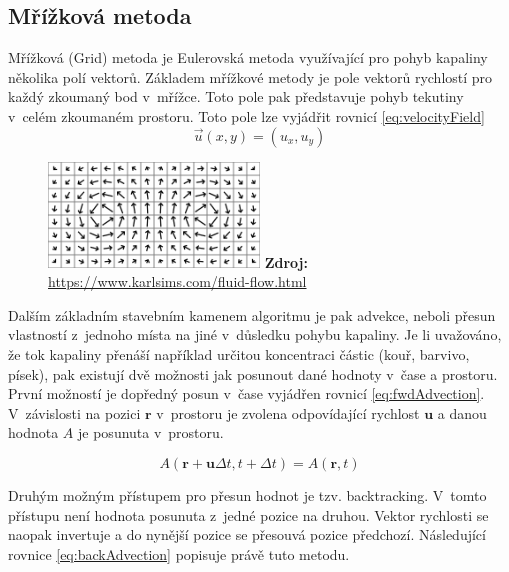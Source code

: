 \subsection{Mřížková metoda}
\label{chapter:Grid}
Mřížková (Grid) metoda je Eulerovská metoda využívající pro pohyb kapaliny několika polí vektorů. Základem mřížkové metody je pole vektorů rychlostí pro každý zkoumaný bod v~mřížce. Toto pole pak představuje pohyb tekutiny v~celém zkoumaném prostoru. Toto pole lze vyjádřit rovnicí \ref{eq:velocityField}
\begin{equation}
	\Vec{u}(x,y) = (u_x,u_y)
	\label{eq:velocityField}
\end{equation}

\begin{figure}[hbt]
	\captionsetup{justification=centering}
	\centering
	\includegraphics[width=0.5\textwidth]{obrazky-figures/flow-field.png}
	\textbf{Zdroj: } \url{https://www.karlsims.com/fluid-flow.html}
	\label{fig:VelocityField}
\end{figure}

Dalším základním stavebním kamenem algoritmu je pak advekce, neboli přesun vlastností z~jednoho místa na jiné v~důsledku pohybu kapaliny. Je li uvažováno, že tok kapaliny přenáší například určitou koncentraci částic (kouř, barvivo, písek), pak existují dvě možnosti jak posunout dané hodnoty v~čase a prostoru.  První možností je dopředný posun v~čase vyjádřen rovnicí \ref{eq:fwdAdvection}. V~závislosti na pozici $\mathbf{r}$ v~prostoru je zvolena odpovídající rychlost $\mathbf{u}$ a danou hodnota $A$ je posunuta v~prostoru.

\begin{equation}
	A(\mathbf{r} + \mathbf{u}\Delta t, t + \Delta t) = A(\mathbf{r}, t)
	\label{eq:fwdAdvection}
\end{equation}

Druhým možným přístupem pro přesun hodnot je tzv. backtracking. V~tomto přístupu není hodnota posunuta z~jedné pozice na druhou. Vektor rychlosti se naopak invertuje a do nynější pozice se přesouvá pozice předchozí. Následující rovnice \ref{eq:backAdvection} popisuje právě tuto metodu. \cite{webglFluid}

